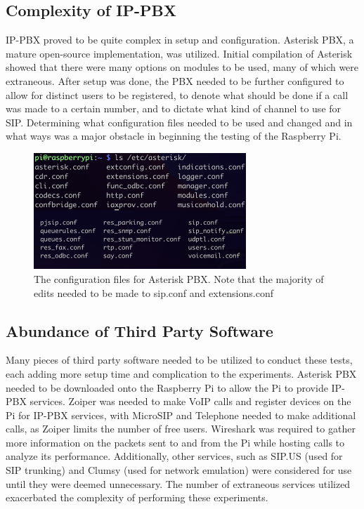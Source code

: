 	\subsection{Complexity of IP-PBX}
	    IP-PBX proved to be quite complex in setup and configuration. Asterisk PBX, a mature open-source implementation, was utilized. Initial compilation of Asterisk showed that there were many options on modules to be used, many of which were extraneous. After setup was done, the PBX needed to be further configured to allow for distinct users to be registered, to denote what should be done if a call was made to a certain number, and to dictate what kind of channel to use for SIP. Determining what configuration files needed to be used and changed and in what ways was a major obstacle in beginning the testing of the Raspberry Pi.
	    
	    \begin{figure}[htbp]
			\centerline{\includegraphics[width=8cm]{Images/experiment/config.png}}
			\caption{The configuration files for Asterisk PBX. Note that the majority of edits needed to be made to sip.conf and extensions.conf}
			\label{fig:conf}
		\end{figure}
		
	\subsection{Abundance of Third Party Software}
	    Many pieces of third party software needed to be utilized to conduct these tests, each adding more setup time and complication to the experiments. Asterisk PBX needed to be downloaded onto the Raspberry Pi to allow the Pi to provide IP-PBX services. Zoiper was needed to make VoIP calls and register devices on the Pi for IP-PBX services, with MicroSIP and Telephone needed to make additional calls, as Zoiper limits the number of free users. Wireshark was required to gather more information on the packets sent to and from the Pi while hosting calls to analyze its performance. Additionally, other services, such as SIP.US (used for SIP trunking) and Clumsy (used for network emulation) were considered for use until they were deemed unnecessary. The number of extraneous services utilized exacerbated the complexity of performing these experiments. 